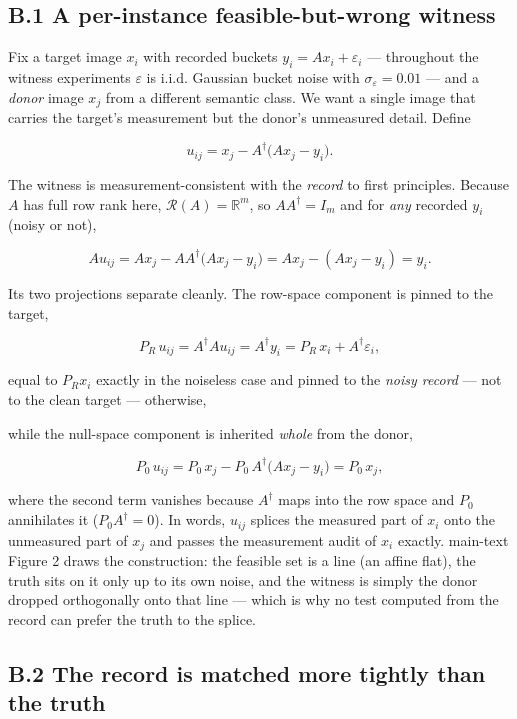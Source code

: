 \documentclass[11pt]{article}
\begin{document}
\subsection*{B.1 A per-instance feasible-but-wrong witness}

Fix a target image $x_i$ with recorded buckets $y_i = A x_i + \varepsilon_i$ --- throughout the witness experiments $\varepsilon$ is i.i.d. Gaussian bucket noise with $\sigma_\varepsilon = 0.01$ --- and a \textit{donor} image $x_j$ from a different semantic class. We want a single image that carries the target's measurement but the donor's unmeasured detail. Define

$$u_{ij} = x_j - A^\dagger\big(A x_j - y_i\big).$$

The witness is measurement-consistent with the \textit{record} to first principles. Because $A$ has full row rank here, $\mathcal{R}(A) = \mathbb{R}^m$, so $A A^\dagger = I_m$ and for \textit{any} recorded $y_i$ (noisy or not),

$$A u_{ij} = A x_j - A A^\dagger\big(A x_j - y_i\big) = A x_j - (A x_j - y_i) = y_i.$$

Its two projections separate cleanly. The row-space component is pinned to the target,

$$P_R\, u_{ij} = A^\dagger A u_{ij} = A^\dagger y_i = P_R\, x_i + A^\dagger \varepsilon_i,$$

equal to $P_R x_i$ exactly in the noiseless case and pinned to the \textit{noisy record} --- not to the clean target --- otherwise,

while the null-space component is inherited \textit{whole} from the donor,

$$P_0\, u_{ij} = P_0\, x_j - P_0\, A^\dagger\big(A x_j - y_i\big) = P_0\, x_j,$$

where the second term vanishes because $A^\dagger$ maps into the row space and $P_0$ annihilates it ($P_0 A^\dagger = 0$). In words, $u_{ij}$ splices the measured part of $x_i$ onto the unmeasured part of $x_j$ and passes the measurement audit of $x_i$ exactly. main-text Figure 2 draws the construction: the feasible set is a line (an affine flat), the truth sits on it only up to its own noise, and the witness is simply the donor dropped orthogonally onto that line --- which is why no test computed from the record can prefer the truth to the splice.


\subsection*{B.2 The record is matched more tightly than the truth}
\end{document}
